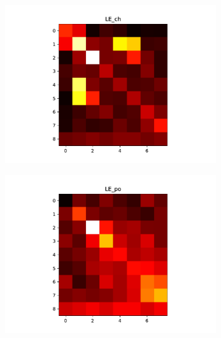 \begin{figure}[H]
\begin{subfigure}{0.48\textwidth}
\end{subfigure}
\begin{subfigure}{0.48\textwidth}
\includegraphics[width = \textwidth]{../fig/heatmap_LE_ch.pdf}
\end{subfigure}
\begin{subfigure}{0.48\textwidth}
\includegraphics[width = \textwidth]{../fig/heatmap_LE_po.pdf}
\end{subfigure}
\begin{subfigure}{0.48\textwidth}

\end{subfigure}
\end{figure}
